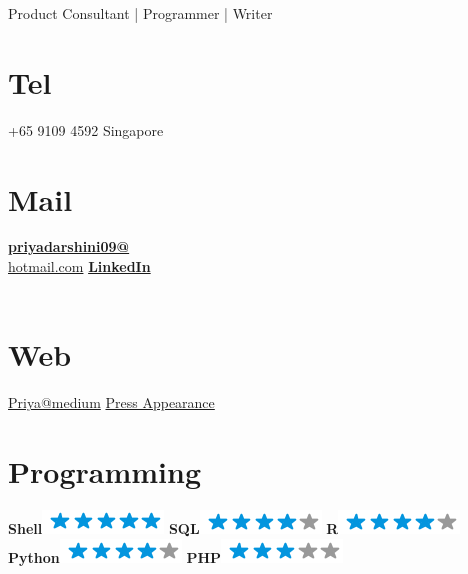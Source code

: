 \documentclass[]{friggeri-cv}
\begin{document}
      {Product Consultant | Programmer | Writer}
      

\begin{aside}

  \section{Tel}
    +65 9109 4592
    Singapore
    ~
  \section{Mail}
    \href{mailto:priyadarshini09@hotmail.com}{\textbf{priyadarshini09@}\\hotmail.com}
    \href{https://www.linkedin.com/in/pmajumdar}{\textbf{LinkedIn}\\}
    ~
  \section{Web}
    \href{https://medium.com/@priyadarshinimajumdar}{Priya@medium}
    \href{https://www.straitstimes.com/singapore/education/first-students-here-to-send-experiment-to-iss}{Press Appearance}
    ~
  \section{Programming}
     \textbf{Shell}\includegraphics[scale=0.40]{img/5stars.png}
     \textbf{SQL}\includegraphics[scale=0.40]{img/4stars.png}
     \textbf{R}\includegraphics[scale=0.40]{img/4stars.png}
     \textbf{Python}\includegraphics[scale=0.40]{img/4stars.png}
     \textbf{PHP}\includegraphics[scale=0.40]{img/3stars.png}
    ~

\end{aside}
\end{document}
